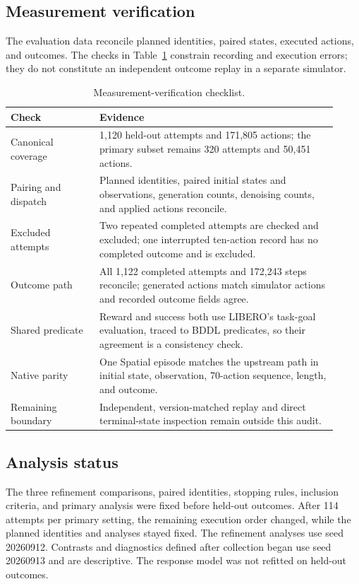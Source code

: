\documentclass{article}
\begin{document}
{\small
\subsection{Measurement verification}
\label{app:verification}

The evaluation data reconcile planned identities, paired states, executed
actions, and outcomes. The checks
in Table~\ref{tab:verification-summary} constrain recording and execution
errors; they do not constitute an
independent outcome replay in a separate simulator.

\begin{table}[H]
\centering\small
\caption{Measurement-verification checklist.}
\label{tab:verification-summary}
\begin{tabular}{@{}p{0.25\linewidth}p{0.67\linewidth}@{}}
\toprule
Check & Evidence\\
\midrule
Canonical coverage & 1,120 held-out attempts and 171,805 actions; the
primary subset remains 320 attempts and 50,451 actions.\\
Pairing and dispatch & Planned identities, paired initial states and
observations, generation counts, denoising counts, and applied actions reconcile.\\
Excluded attempts & Two repeated completed attempts are checked and excluded;
one interrupted ten-action record has no completed outcome and is excluded.\\
Outcome path & All 1,122 completed attempts and 172,243 steps reconcile;
generated actions match simulator actions and recorded outcome fields agree.\\
Shared predicate & Reward and success both use LIBERO's task-goal evaluation,
traced to BDDL predicates, so their agreement is a consistency check.\\
Native parity & One Spatial episode matches the upstream path in initial state,
observation, 70-action sequence, length, and outcome.\\
Remaining boundary & Independent, version-matched replay and direct terminal-state
inspection remain outside this audit.\\
\bottomrule
\end{tabular}
\end{table}
\FloatBarrier
\subsection{Analysis status}
\label{app:analysis-status}

The three refinement comparisons, paired identities, stopping rules, inclusion
criteria, and primary analysis were fixed before held-out outcomes. After
114 attempts per primary setting, the remaining execution order changed, while
the planned identities and analyses stayed fixed. The refinement analyses use
seed 20260912. Contrasts and diagnostics defined after collection began use seed
20260913 and are descriptive. The response model was not refitted on held-out
outcomes.

}
\end{document}
